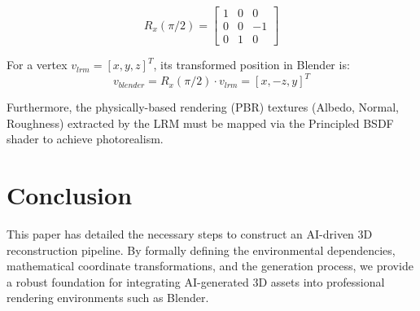 \documentclass[10pt,journal,compsoc]{IEEEtran}
\begin{document}
\[ R_x(\pi/2) = \begin{bmatrix} 1 & 0 & 0 \\ 0 & 0 & -1 \\ 0 & 1 & 0 \end{bmatrix} \]

For a vertex $v_{lrm} = [x, y, z]^T$, its transformed position in Blender is:
\[ v_{blender} = R_x(\pi/2) \cdot v_{lrm} = [x, -z, y]^T \]

Furthermore, the physically-based rendering (PBR) textures (Albedo, Normal, Roughness) extracted by the LRM must be mapped via the Principled BSDF shader to achieve photorealism.

\section{Conclusion}
This paper has detailed the necessary steps to construct an AI-driven 3D reconstruction pipeline. By formally defining the environmental dependencies, mathematical coordinate transformations, and the generation process, we provide a robust foundation for integrating AI-generated 3D assets into professional rendering environments such as Blender.
\end{document}
